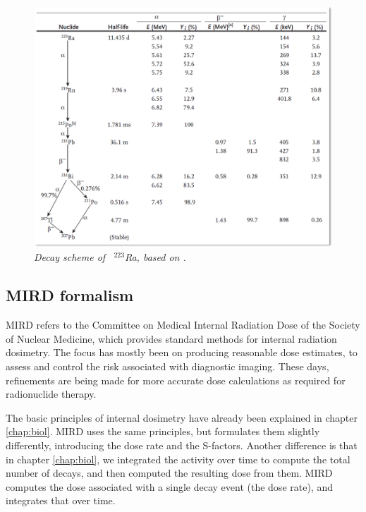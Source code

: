 \documentclass[11pt,oneside]{article}
\begin{document}
\begin{figure}[htb]
  \includegraphics[width=\textwidth]{figs/fig_223Ra.png}
  \centering
  \caption{\label{fig:223Ra} \emph{Decay scheme of \, $^{223}$Ra,
      based on \cite{Martin2006}.}}
\end{figure}


\subsection{MIRD formalism}
MIRD refers to the Committee on Medical Internal Radiation Dose of the
Society of Nuclear Medicine, which provides standard methods for
internal radiation dosimetry. The focus has mostly been on producing
reasonable dose estimates, to assess and control the risk associated
with diagnostic imaging. These days, refinements are being made for
more accurate dose calculations as required for radionuclide therapy.

The basic principles of internal dosimetry have already been explained
in chapter \ref{chap:biol}. MIRD uses the same principles, but
formulates them slightly differently, introducing the dose rate and
the S-factors. Another difference is that in chapter \ref{chap:biol},
we integrated the activity over time to compute the total number of
decays, and then computed the resulting dose from them. MIRD computes
the dose associated with a single decay event (the dose rate), and
integrates that over time.
\end{document}
